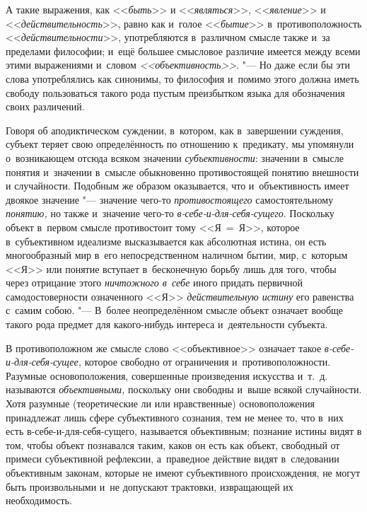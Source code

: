 А такие выражения, как <<{\em быть}>> и <<{\em являться}>>,
<<{\em явление}>> и <<{\em действительность}>>, равно как и~голое
<<{\em бытие}>> в~противоположность <<{\em действительности}>>,
употребляются в~различном смысле также и~за пределами
философии; и~ещё большее смысловое различие имеется между всеми этими
выражениями и~словом {\em <<объективность>>}. "---
Но даже если бы эти слова употреблялись как синонимы, то
философия и~помимо этого должна иметь свободу пользоваться такого рода
пустым преизбытком языка для обозначения своих различений.

Говоря об аподиктическом суждении, в~котором, как в~завершении
суждения, субъект теряет свою определённость по отношению к~предикату, мы
упомянули о~возникающем отсюда всяком значении {\em субъективности}:
значении в~смысле понятия и~значении в~смысле обыкновенно
противостоящей понятию внешности и
случайности.
Подобным же образом оказывается, что и~объективность имеет
двоякое значение "--- значение чего-то {\em противостоящего}
самостоятельному {\em понятию,} но также и~значение чего-то
{\em в-себе-и-для-себя-сущего}.
Поскольку объект в~первом смысле противостоит тому <<Я~=~Я>>,
которое в~субъективном идеализме высказывается как абсолютная истина, он
есть многообразный мир в~его непосредственном наличном
бытии, мир, с~которым <<Я>> или понятие вступает в~бесконечную борьбу лишь
для того, чтобы через отрицание этого {\em ничтожного в~себе}
иного придать первичной самодостоверности означенного <<Я>>
{\em действительную истину} его равенства с~самим
собою.
"--- В~более неопределённом смысле объект означает вообще такого
рода предмет для какого-нибудь интереса и~деятельности субъекта.

В противоположном же смысле слово <<объективное>> означает такое
{\em в-себе-и-для-себя-сущее,}
которое свободно от ограничения и~противоположности. Разумные
основоположения, совершенные произведения искусства и~т.~д. называются
{\em объективными,}
поскольку они свободны и~выше всякой случайности. Хотя
разумные (теоретические ли или нравственные) основоположения принадлежат
лишь сфере субъективного сознания, тем не менее то, что в~них есть
в-себе-и-для-себя-сущего, называется объективным; познание истины видят в
том, чтобы объект познавался таким, каков он есть как объект, свободный от
примеси субъективной рефлексии, а~праведное действие видят в~следовании
объективным законам, которые не имеют субъективного происхождения, не могут
быть произвольными и~не допускают трактовки, извращающей их необходимость.

